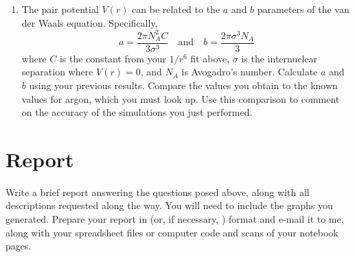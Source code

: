 \documentclass[10pt]{article}
\begin{document}
\begin{enumerate}
    \item The pair potential $V(r)$ can be related to the $a$ and $b$ parameters of the van der Waals equation.
      Specifically,
      \[
      a = \frac{2\pi N_A^2 C}{3\sigma^3} \quad \text{and} \quad b=\frac{2\pi \sigma^3 N_A}{3}
      \]
      where $C$ is the constant from your $1/r^6$ fit above, $\sigma$ is the internuclear separation where $V(r) = 0$, and $N_A$ is Avogadro's number.
      Calculate $a$ and $b$ using your previous results.
      Compare the values you obtain to the known values for argon, which you must look up.
      Use this comparison to comment on the accuracy of the simulations you just performed.

  \end{enumerate}
      
\section{Report}
Write a brief report answering the questions posed above, along with all descriptions requested along the way.
You will need to include the graphs you generated.
Prepare your report in  (or, if necessary, ) format and e-mail it to me, along with your spreadsheet files or computer code and scans of your notebook pages.
\end{document}
